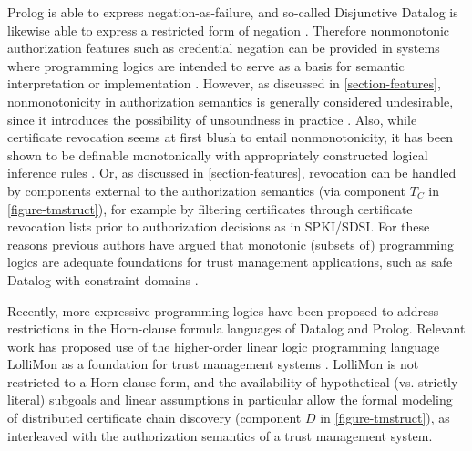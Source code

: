 Prolog is able to express negation-as-failure, and so-called
Disjunctive Datalog is likewise able to express a restricted form of
negation \cite{eiter-etal-tdbs97}.  
Therefore nonmonotonic
authorization features such as credential negation can be provided in
systems where programming logics are intended to serve as a basis for
semantic interpretation or implementation
\cite{woo93authorizations,bonatti-logicsforauth}.  However, as
discussed in \autoref{section-features}, nonmonotonicity in
authorization semantics is generally considered undesirable, since it
introduces the possibility of unsoundness in practice
\cite{seamons-policy02}.  Also, while certificate revocation seems at
first blush to entail nonmonotonicity, it has been shown to be
definable monotonically with appropriately constructed logical
inference rules \cite{lbi-fc01,Bauer:GFACSW}.  Or, as discussed in
\autoref{section-features}, revocation can be handled by components
external to the authorization semantics (via component $T_C$ in
\autoref{figure-tmstruct}), for example by filtering certificates
through certificate revocation lists prior to authorization decisions
as in SPKI/SDSI.  For these reasons previous authors have argued that
monotonic (subsets of) programming logics are adequate foundations for
trust management applications, such as safe Datalog with constraint
domains \cite{Li:DCFTML}.

Recently, more expressive programming logics have been proposed to
address restrictions in the Horn-clause formula languages of Datalog
and Prolog.  Relevant work has proposed use of the higher-order linear
logic programming language LolliMon as a foundation for trust
management systems \cite{polakow-skalka-plas06}.  LolliMon is not
restricted to a Horn-clause form, and the availability of hypothetical
(vs. strictly literal) subgoals and linear assumptions in particular
allow the formal modeling of distributed certificate chain discovery
(component $D$ in \autoref{figure-tmstruct}), as interleaved with the
authorization semantics of a trust management system.
